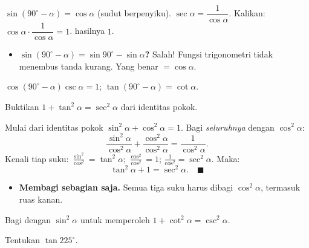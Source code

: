 \jawab
{} $\sin(90^\circ-\alpha)=\cos\alpha$ (sudut berpenyiku).
 $\sec\alpha=\dfrac{1}{\cos\alpha}$.
 Kalikan: $\cos\alpha\cdot\dfrac{1}{\cos\alpha}=1$.
\jadi hasilnya $1$.

\begin{jebakan}
\begin{itemize}[leftmargin=*,topsep=2pt]
  \item \textbf{$\sin(90^\circ-\alpha)=\sin90^\circ-\sin\alpha$?} Salah! Fungsi
  trigonometri tidak menembus tanda kurang. Yang benar $=\cos\alpha$.
\end{itemize}
\end{jebakan}

\begin{variasi}
$\cos(90^\circ-\alpha)\csc\alpha=1$; $\tan(90^\circ-\alpha)=\cot\alpha$.
\end{variasi}

\begin{soalbox}{}
Buktikan $1+\tan^2\alpha=\sec^2\alpha$ dari identitas pokok.
\end{soalbox}

\jawab
{} Mulai dari identitas pokok $\sin^2\alpha+\cos^2\alpha=1$.
 Bagi \emph{seluruhnya} dengan $\cos^2\alpha$:
\[
\frac{\sin^2\alpha}{\cos^2\alpha}+\frac{\cos^2\alpha}{\cos^2\alpha}
=\frac{1}{\cos^2\alpha}.
\]
 Kenali tiap suku: $\frac{\sin^2}{\cos^2}=\tan^2\alpha$;
$\frac{\cos^2}{\cos^2}=1$; $\frac{1}{\cos^2}=\sec^2\alpha$. Maka:
\[
\tan^2\alpha+1=\sec^2\alpha. \quad\blacksquare
\]

\begin{jebakan}
\begin{itemize}[leftmargin=*,topsep=2pt]
  \item \textbf{Membagi sebagian saja.} Semua tiga suku harus dibagi
  $\cos^2\alpha$, termasuk ruas kanan.
\end{itemize}
\end{jebakan}

\begin{variasi}
Bagi dengan $\sin^2\alpha$ untuk memperoleh $1+\cot^2\alpha=\csc^2\alpha$.
\end{variasi}

\begin{soalbox}{}
Tentukan $\tan225^\circ$.
\end{soalbox}

